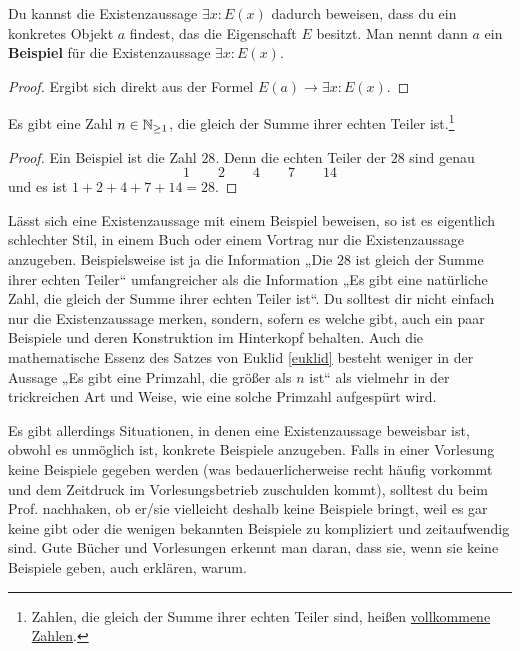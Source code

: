 \begin{satz} \label{beweisperbsp} 
    Du kannst die Existenzaussage $\exists x: E(x)$ dadurch beweisen, dass du ein konkretes Objekt $a$ findest, das die Eigenschaft $E$ besitzt. Man nennt dann $a$ ein \textbf{Beispiel} für die Existenzaussage $\exists x: E(x)$.
\end{satz}
\begin{proof}
    Ergibt sich direkt aus der Formel $E(a)\to\exists x:E(x)$.
\end{proof}


\begin{bsp}
    Es gibt eine Zahl $n\in \mathbb N_{\ge 1}$, die gleich der Summe ihrer echten Teiler ist.\footnote{Zahlen, die gleich der Summe ihrer echten Teiler sind, heißen \href{https://de.wikipedia.org/wiki/Vollkommene_Zahl}{vollkommene Zahlen}.}
\end{bsp}
\begin{proof}
    Ein Beispiel ist die Zahl $28$. Denn die echten Teiler der $28$ sind genau
        \[ 1 \qquad 2 \qquad 4 \qquad 7 \qquad 14 \]
    und es ist $1+2+4+7+14=28$.
\end{proof}

  
\begin{bem}
    Lässt sich eine Existenzaussage mit einem Beispiel beweisen, so ist es eigentlich schlechter Stil, in einem Buch oder einem Vortrag nur die Existenzaussage anzugeben. Beispielsweise ist ja die Information „Die $28$ ist gleich der Summe ihrer echten Teiler“ umfangreicher als die Information „Es gibt eine natürliche Zahl, die gleich der Summe ihrer echten Teiler ist“. Du solltest dir nicht einfach nur die Existenzaussage merken, sondern, sofern es welche gibt, auch ein paar Beispiele und deren Konstruktion im Hinterkopf behalten. Auch die mathematische Essenz des Satzes von Euklid \cref{euklid} besteht weniger in der Aussage „Es gibt eine Primzahl, die größer als $n$ ist“ als vielmehr in der trickreichen Art und Weise, wie eine solche Primzahl aufgespürt wird.
    
    Es gibt allerdings Situationen, in denen eine Existenzaussage beweisbar ist, obwohl es unmöglich ist, konkrete Beispiele anzugeben. Falls in einer Vorlesung keine Beispiele gegeben werden (was bedauerlicherweise recht häufig vorkommt und dem Zeitdruck im Vorlesungsbetrieb zuschulden kommt), solltest du beim Prof. nachhaken, ob er/sie vielleicht deshalb keine Beispiele bringt, weil es gar keine gibt oder die wenigen bekannten Beispiele zu kompliziert und zeitaufwendig sind. Gute Bücher und Vorlesungen erkennt man daran, dass sie, wenn sie keine Beispiele geben, auch erklären, warum.
\end{bem}


